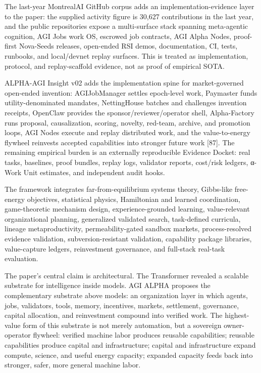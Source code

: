 \documentclass[
  11pt,
]{article}
\begin{document}
The last-year MontrealAI GitHub corpus adds an implementation-evidence
layer to the paper: the supplied activity figure is 30,627 contributions
in the last year, and the public repositories expose a multi-surface
stack spanning meta-agentic cognition, AGI Jobs work OS, escrowed job
contracts, AGI Alpha Nodes, proof-first Nova-Seeds releases, open-ended
RSI demos, documentation, CI, tests, runbooks, and local/devnet replay
surfaces. This is treated as implementation, protocol, and
replay-scaffold evidence, not as proof of empirical SOTA.

ALPHA-AGI Insight v02 adds the implementation spine for market-governed
open-ended invention: AGIJobManager settles epoch-level work, Paymaster
funds utility-denominated mandates, NettingHouse batches and challenges
invention receipts, OpenClaw provides the sponsor/reviewer/operator
shell, Alpha-Factory runs proposal, causalization, scoring, novelty,
red-team, archive, and promotion loops, AGI Nodes execute and replay
distributed work, and the value-to-energy flywheel reinvests accepted
capabilities into stronger future work {[}87{]}. The remaining empirical
burden is an externally reproducible Evidence Docket: real tasks,
baselines, proof bundles, replay logs, validator reports, cost/risk
ledgers, α-Work Unit estimates, and independent audit hooks.

The framework integrates far-from-equilibrium systems theory, Gibbs-like
free-energy objectives, statistical physics, Hamiltonian and learned
coordination, game-theoretic mechanism design, experience-grounded
learning, value-relevant organizational planning, generalized validated
search, task-defined curricula, lineage metaproductivity,
permeability-gated sandbox markets, process-resolved evidence
validation, subversion-resistant validation, capability package
libraries, value-capture ledgers, reinvestment governance, and
full-stack real-task evaluation.

The paper's central claim is architectural. The Transformer revealed a
scalable substrate for intelligence inside models. AGI ALPHA proposes
the complementary substrate above models: an organization layer in which
agents, jobs, validators, tools, memory, incentives, markets,
settlement, governance, capital allocation, and reinvestment compound
into verified work. The highest-value form of this substrate is not
merely automation, but a sovereign owner-operator flywheel: verified
machine labor produces reusable capabilities; reusable capabilities
produce capital and infrastructure; capital and infrastructure expand
compute, science, and useful energy capacity; expanded capacity feeds
back into stronger, safer, more general machine labor.
\end{document}
